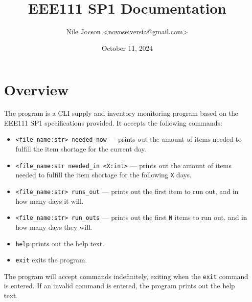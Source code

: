 \documentclass{article}
\title{EEE111 SP1 Documentation}
\author{Nile Jocson \textless{novoseiversia@gmail.com}\textgreater}
\date{October 11, 2024}
\begin{document}
	\maketitle
		\pagebreak



	\tableofcontents
		\pagebreak



	\section{Overview}
		The program is a CLI supply and inventory monitoring program based on
		the EEE111 SP1 specifications provided. It accepts the following commands:

		\begin{itemize}
			\item \verb|<file_name:str> needed_now| --- prints out the amount of items
			needed to fulfill the item shortage for the current day.
			\item \verb|<file_name:str needed_in <X:int>| --- prints out the amount of items
			needed to fulfill the item shortage for the following \verb|X| days.
			\item \verb|<file_name:str> runs_out| --- prints out the first item to run out, and
			in how many days it will.
			\item \verb|<file_name:str> run_outs| --- prints out the first \verb|N| items to run
			out, and in how many days they will.
			\item \verb|help| prints out the help text.
			\item \verb|exit| exits the program.
		\end{itemize}

		The program will accept commands indefinitely, exiting when the \verb|exit| command is
		entered. If an invalid command is entered, the program prints out the help text.

		\pagebreak
\end{document}
